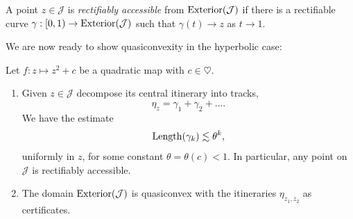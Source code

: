 

\begin{definition}
	A point $z \in \mathcal J$ is \emph{rectifiably accessible} from $\operatorname{Exterior}(\mathcal J)$ if there is a rectifiable curve $\gamma: [0,1) \to \operatorname{Exterior}(\mathcal J)$ such that $\gamma (t) \to z$ as $t \to 1$.
\end{definition}

We are now ready to show quasiconvexity in the hyperbolic case:

\begin{theorem}  Let $f:z \mapsto z^2+c$ be a quadratic map with $c \in \heartsuit$. \leavevmode
\begin{enumerate}[label=\normalfont(\roman*)]

\item Given $z\in\mathcal{J}$ decompose its central itinerary into tracks, 
\begin{equation*}
\eta_z = \gamma _1 +\gamma_2 +\dots.
\end{equation*}
We have the estimate
\begin{equation*}
\operatorname{Length}(\gamma_{k})\lesssim\theta^{k},
\end{equation*}
uniformly in $z$, for some constant $\theta=\theta(c)<1$. 
In particular, any point on \(\mathcal{J}\) is rectifiably accessible.

\item The domain $\operatorname{Exterior}(\mathcal{J})$ is quasiconvex with the itineraries $\eta_{z_1,z_2}$ as certificates.
	\end{enumerate}
\end{theorem}

